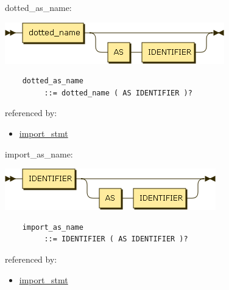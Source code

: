 \begin{minipage}{\textwidth}
    \protect\hypertarget{dotted_as_name}{}{dotted\_as\_name:}

    \includegraphics[width=3.75000in,height=0.70833in]{diagram/dotted_as_name.png}

    \begin{verbatim}
    dotted_as_name
         ::= dotted_name ( AS IDENTIFIER )?
    \end{verbatim}

    referenced by:

    \begin{itemize}
            \tightlist
        \item
            \protect\hyperlink{import_stmt}{import\_stmt}
    \end{itemize}

\end{minipage}

\begin{minipage}{\textwidth}
    \protect\hypertarget{import_as_name}{}{import\_as\_name:}

    \includegraphics[width=3.60417in,height=0.70833in]{diagram/import_as_name.png}

    \begin{verbatim}
    import_as_name
         ::= IDENTIFIER ( AS IDENTIFIER )?
    \end{verbatim}

    referenced by:

    \begin{itemize}
            \tightlist
        \item
            \protect\hyperlink{import_stmt}{import\_stmt}
    \end{itemize}

\end{minipage}

